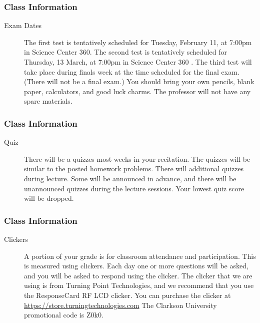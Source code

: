 \begin{frame}
  \frametitle{Class Information}

\begin{description}
  \item[Exam Dates] The first test is tentatively scheduled for
    Tuesday, February 11, at 7:00pm in Science Center 360. The second
    test is tentatively scheduled for Thursday, 13 March, at 7:00pm in
    Science Center 360 . The third test will take place during finals
    week at the time scheduled for the final exam. (There will not be
    a final exam.) You should bring your own pencils, blank paper,
    calculators, and good luck charms.  The professor will not have
    any spare materials.
 
\end{description}

\end{frame}

\begin{frame}
  \frametitle{Class Information}

\begin{description}
\item[Quiz] There will be a quizzes most weeks in your recitation. The
  quizzes will be similar to the posted homework problems. There will
  additional quizzes during lecture. Some will be announced in
  advance, and there will be unannounced quizzes during the lecture
  sessions.  Your lowest quiz score will be dropped.

\end{description}

\end{frame}


\begin{frame}
  \frametitle{Class Information}

\begin{description}
  \item[Clickers] A portion of your grade is for classroom attendance
    and participation. This is measured using clickers. Each day one
    or more questions will be asked, and you will be asked to respond
    using the clicker. The clicker that we are using is from Turning
    Point Technologies, and we recommend that you use the ResponseCard
    RF LCD clicker. You can purchase the clicker at
    \url{https://store.turningtechnologies.com} The Clarkson
    University promotional code is Z0k0.

\end{description}

\end{frame}

